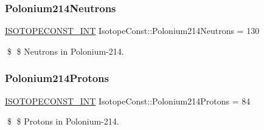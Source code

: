 \subsubsection{\texorpdfstring{Polonium214\+Neutrons}{Polonium214Neutrons}}
{\footnotesize\ttfamily \mbox{\hyperlink{group___isotope_const-_macros_ga5f18360b3e99483a35c32d789e62621c}{I\+S\+O\+T\+O\+P\+E\+C\+O\+N\+S\+T\+\_\+\+I\+NT}} Isotope\+Const\+::\+Polonium214\+Neutrons = 130}

\$ \$ Neutrons in Polonium-\/214. \mbox{\label{group___isotope_const-_polonium-_po214_ga3c983859eb45c649ed7a60fcacbdc90e}} 
\subsubsection{\texorpdfstring{Polonium214\+Protons}{Polonium214Protons}}
{\footnotesize\ttfamily \mbox{\hyperlink{group___isotope_const-_macros_ga5f18360b3e99483a35c32d789e62621c}{I\+S\+O\+T\+O\+P\+E\+C\+O\+N\+S\+T\+\_\+\+I\+NT}} Isotope\+Const\+::\+Polonium214\+Protons = 84}

\$ \$ Protons in Polonium-\/214. 
